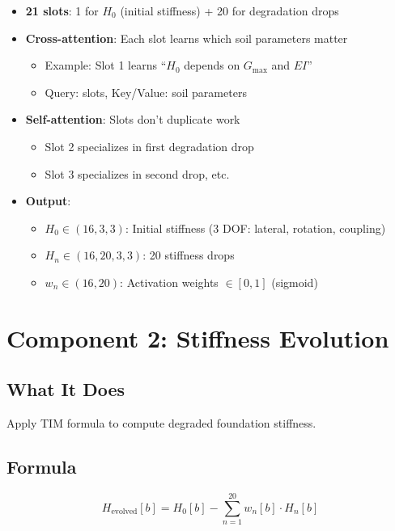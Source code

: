 \documentclass[11pt,a4paper]{article}
\begin{document}
\begin{itemize}
  \item \textbf{21 slots}: 1 for $H_0$ (initial stiffness) + 20 for degradation drops
  \item \textbf{Cross-attention}: Each slot learns which soil parameters matter
    \begin{itemize}
      \item Example: Slot 1 learns ``$H_0$ depends on $G_{\max}$ and $EI$''
      \item Query: slots, Key/Value: soil parameters
    \end{itemize}
  \item \textbf{Self-attention}: Slots don't duplicate work
    \begin{itemize}
      \item Slot 2 specializes in first degradation drop
      \item Slot 3 specializes in second drop, etc.
    \end{itemize}
  \item \textbf{Output}:
    \begin{itemize}
      \item $H_0 \in (16, 3, 3)$: Initial stiffness (3 DOF: lateral, rotation, coupling)
      \item $H_n \in (16, 20, 3, 3)$: 20 stiffness drops
      \item $w_n \in (16, 20)$: Activation weights $\in [0, 1]$ (sigmoid)
    \end{itemize}
\end{itemize}

\section{Component 2: Stiffness Evolution}

\subsection{What It Does}

Apply TIM formula to compute degraded foundation stiffness.

\subsection{Formula}

\begin{equation}
H_{\text{evolved}}[b] = H_0[b] - \sum_{n=1}^{20} w_n[b] \cdot H_n[b]
\end{equation}
\end{document}
